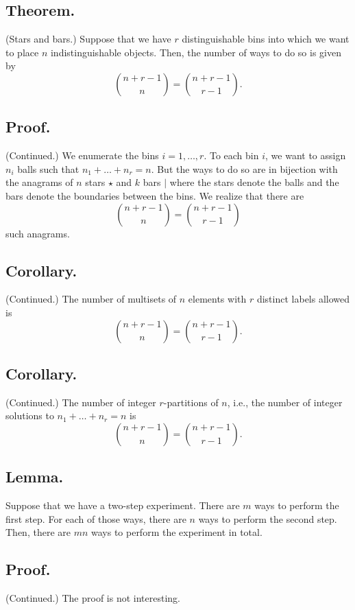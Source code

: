 \documentclass[titlepage]{article}
\begin{document}
\subsection{Theorem.} (Stars and bars.) Suppose that we have $r$ distinguishable bins into which we want to place $n$ indistinguishable objects. Then, the number of ways to do so is given by 
$$\binom{n+r-1}{n} = \binom{n+r-1}{r-1}.$$

\subsection{Proof.} (Continued.) We enumerate the bins $i = 1, \ldots, r$. To each bin $i$, we want to assign $n_{i}$ balls such that $n_{1} + \ldots + n_{r} = n$. But the ways to do so are in bijection with the anagrams of $n$ stars $\star$ and $k$ bars $\vert$ where the stars denote the balls and the bars denote the boundaries between the bins. We realize that there are 
$$\binom{n+r-1}{n} = \binom{n+r-1}{r-1}$$
such anagrams.

\subsection{Corollary.} (Continued.) The number of multisets of $n$ elements with $r$ distinct labels allowed is 
$$\binom{n+r-1}{n} = \binom{n+r-1}{r-1}.$$

\subsection{Corollary.} (Continued.) The number of integer $r$-partitions of $n$, i.e., the number of integer solutions to $n_{1} + \ldots + n_{r} = n$ is 
$$\binom{n+r-1}{n} = \binom{n+r-1}{r-1}.$$

\subsection{Lemma.} Suppose that we have a two-step experiment. There are $m$ ways to perform the first step. For each of those ways, there are $n$ ways to perform the second step. Then, there are $mn$ ways to perform the experiment in total.

\subsection{Proof.} (Continued.) The proof is not interesting.

\newpage {}
\end{document}
